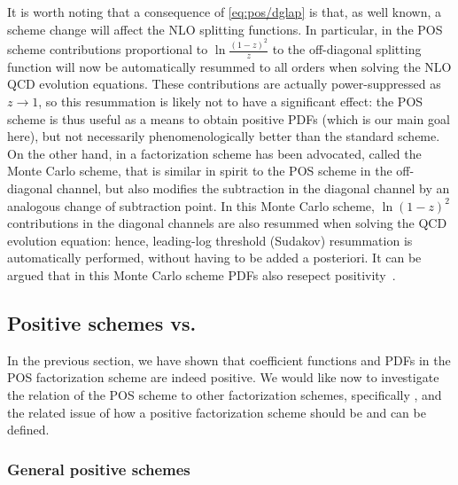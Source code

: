It is worth noting that a consequence of \cref{eq:pos/dglap} is that,
as well known, a scheme change will affect the NLO splitting
functions. In particular, in the POS scheme contributions proportional
to $\ln\frac{(1-z)^2}{z}$ to the off-diagonal splitting function will
now be automatically resummed to all orders when solving the NLO QCD
evolution equations. These contributions are actually power-suppressed
as $z\to1$, so this resummation is likely not to have a significant
effect: the POS scheme is thus useful as a means to obtain positive
PDFs (which is our main goal here), but not necessarily
phenomenologically better than the standard \msbar{} scheme. On the
other hand, in \cite{Jadach:2016acv} a factorization scheme has
been advocated, called the Monte Carlo scheme, that is similar in
spirit to the POS scheme in the off-diagonal channel, but also
modifies the \msbar{} subtraction in the diagonal channel by an
analogous change of subtraction point. In this Monte Carlo scheme,
$\ln(1-z)^2$ contributions in the diagonal channels are also resummed
when solving the QCD evolution equation: hence, leading-log threshold (Sudakov)
resummation is automatically performed, without having to be added a
posteriori. It can be argued that in this Monte Carlo scheme PDFs also
resepect positivity~\cite{jadprivate}.



\subsection{Positive schemes vs.\ \msbar{}}
\label{sec:pos/gen}

In the previous section, we have shown that coefficient functions and
PDFs in the POS
factorization scheme are indeed positive. We would like now to
investigate the relation of the POS scheme to other factorization
schemes, specifically \msbar{}, and the related issue 
of
how a positive factorization scheme should be and can be defined.

\subsubsection{General positive schemes}
\label{sec:pos/gensch}


